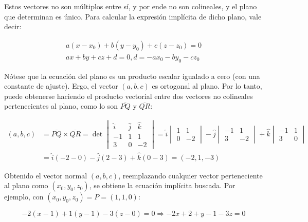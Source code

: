 \documentclass{article}
\begin{document}
Estos vectores no son múltiplos entre sí, y por ende no son colineales, y el plano que determinan es único. Para calcular la expresión implícita de dicho plano, vale decir:

\begin{subequations}
\begin{align}
a (x-x_0) + b (y-y_0) + c (z-z_0) = 0 \\
a x + b y + c z + d = 0, d = -a x_0 -b y_0 -c z_0
\end{align}
\end{subequations}

Nótese que la ecuación del plano es un producto escalar igualado a cero (con una constante de ajuste). Ergo, el vector $(a,b,c)$ es ortogonal al plano. Por lo tanto, puede obtenerse haciendo el producto vectorial entre dos vectores no colineales pertenecientes al plano, como lo son $\overline{PQ}$ y $\overline{QR}$:

\begin{subequations}
\begin{align}
(a,b,c) &= \overline{PQ} \times \overline{QR} = \det \begin{vmatrix}
\hat{i} & \hat{j} & \hat{k} \\
-1 & 1 & 1 \\
3 & 0 & -2
\end{vmatrix} = \hat{i} \begin{vmatrix}1 & 1 \\ 0 & -2\end{vmatrix} - \hat{j} \begin{vmatrix}-1 & 1 \\ 3 & -2\end{vmatrix} + \hat{k} \begin{vmatrix}-1 & 1 \\ 3 & 0\end{vmatrix} \\
& = \hat{i} (-2-0) -\hat{j} (2-3) +\hat{k} (0-3) = (-2, 1, -3)
\end{align}
\end{subequations}

Obtenido el vector normal $(a,b,c)$, reemplazando cualquier vector perteneciente al plano como $(x_0, y_0, z_0)$, se obtiene la ecuación implícita buscada. Por ejemplo, con $(x_0, y_0, z_0) = P = (1, 1, 0)$:

\begin{equation}
-2 (x-1) + 1 (y-1) - 3 (z-0) = 0 \Rightarrow -2x +2 +y -1 -3z = 0 
\end{equation}
\end{document}
